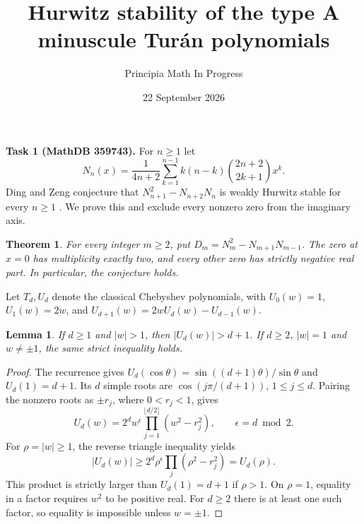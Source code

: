 \documentclass[11pt]{article}
\title{Hurwitz stability of the type A minuscule Tur\'an polynomials}
\author{Principia Math In Progress}
\date{22 September 2026}
\newtheorem{theorem}{Theorem}
\newtheorem{lemma}{Lemma}
\begin{document}
\maketitle

\noindent\textbf{Task 1 (MathDB 359743).}
For $n\ge1$ let
\[
 N_n(x)=\frac1{4n+2}\sum_{k=1}^{n-1}
 k(n-k)\binom{2n+2}{2k+1}x^k.
\]
Ding and Zeng conjecture that $N_{n+1}^2-N_{n+2}N_n$ is weakly
Hurwitz stable for every $n\ge1$ \cite[Conjecture 15]{DZ}.
We prove this and exclude every nonzero zero from the imaginary axis.

\begin{theorem}
For every integer $m\ge2$, put $D_m=N_m^2-N_{m+1}N_{m-1}$.
The zero at $x=0$ has multiplicity exactly two, and every other zero
has strictly negative real part. In particular, the conjecture holds.
\end{theorem}

Let $T_d,U_d$ denote the classical Chebyshev polynomials, with
$U_0(w)=1$, $U_1(w)=2w$, and
$U_{d+1}(w)=2wU_d(w)-U_{d-1}(w)$.

\begin{lemma}\label{lem:bound}
If $d\ge1$ and $|w|>1$, then $|U_d(w)|>d+1$.
If $d\ge2$, $|w|=1$ and $w\ne\pm1$, the same strict inequality holds.
\end{lemma}
\begin{proof}
The recurrence gives
$U_d(\cos\theta)=\sin((d+1)\theta)/\sin\theta$ and $U_d(1)=d+1$.
Its $d$ simple roots are $\cos(j\pi/(d+1))$, $1\le j\le d$.
Pairing the nonzero roots as $\pm r_j$, where $0<r_j<1$, gives
\[
 U_d(w)=2^d w^\epsilon\prod_{j=1}^{\lfloor d/2\rfloor}(w^2-r_j^2),
 \qquad \epsilon=d\bmod2.
\]
For $\rho=|w|\ge1$, the reverse triangle inequality yields
\[
 |U_d(w)|\ge 2^d\rho^\epsilon
 \prod_j(\rho^2-r_j^2)=U_d(\rho).
\]
This product is strictly larger than $U_d(1)=d+1$ if $\rho>1$.
On $\rho=1$, equality in a factor requires $w^2$ to be positive real.
For $d\ge2$ there is at least one such factor, so equality is impossible
unless $w=\pm1$.
\end{proof}
\end{document}
